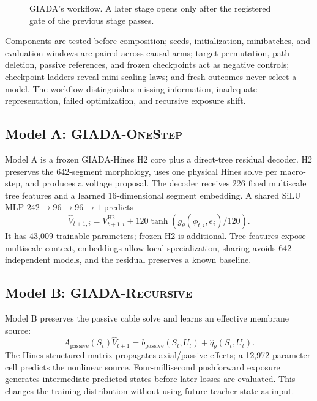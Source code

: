 \documentclass[11pt]{article}
\newcommand{\modela}{\textsc{GIADA-OneStep}}
\newcommand{\modelb}{\textsc{GIADA-Recursive}}
\begin{document}
\begin{figure}[t]
\centering
{}
\caption{GIADA's workflow. A later stage opens only after the registered gate
of the previous stage passes.}
\label{fig:workflow}
\end{figure}

Components are tested before composition; seeds, initialization, minibatches,
and evaluation windows are paired across causal arms; target permutation, path
deletion, passive references, and frozen checkpoints act as negative controls;
checkpoint ladders reveal mini scaling laws; and fresh outcomes never select a
model. The workflow distinguishes missing information, inadequate
representation, failed optimization, and recursive exposure shift.

\subsection{Model A: \modela}

Model A is a frozen GIADA-Hines H2 core plus a direct-tree residual decoder.
H2 preserves the 642-segment morphology, uses one physical Hines solve per
macro-step, and produces a voltage proposal. The decoder receives 226 fixed
multiscale tree features and a learned 16-dimensional segment embedding. A
shared SiLU MLP $242\rightarrow96\rightarrow96\rightarrow1$ predicts
\begin{equation}
 \widehat V_{t+1,i}=V^{\mathrm{H2}}_{t+1,i}
 +120\tanh(g_\theta(\phi_{t,i},e_i)/120).
 \label{eq:modela}
\end{equation}
It has 43,009 trainable parameters; frozen H2 is additional. Tree features
expose multiscale context, embeddings allow local specialization, sharing
avoids 642 independent models, and the residual preserves a known baseline.

\subsection{Model B: \modelb}

Model B preserves the passive cable solve and learns an effective membrane
source:
\begin{equation}
 A_{\mathrm{passive}}(S_t)\widehat V_{t+1}
 =b_{\mathrm{passive}}(S_t,U_t)+\widehat q_\theta(S_t,U_t).
 \label{eq:modelb}
\end{equation}
The Hines-structured matrix propagates axial/passive effects; a
12,972-parameter cell predicts the nonlinear source. Four-millisecond
pushforward exposure generates intermediate predicted states before later
losses are evaluated. This changes the training distribution without using
future teacher state as input.
\end{document}
